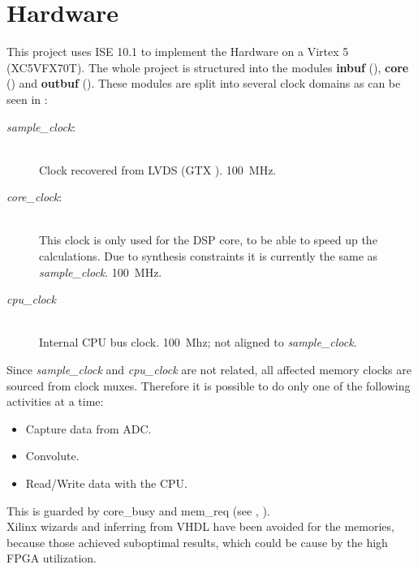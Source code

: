 \documentclass[11pt,technote,a4paper,onecolumn,dvips]{IEEEtran}
\newcommand{\signal}[1]{{\ttfamily #1}}
\newcommand{\module}[1]{{\ttfamily\bfseries #1}}
\newcommand{\clk}[1]{{\itshape\ttfamily #1}}
\begin{document}
\section{Hardware}
\label{sec:hardware}
This project uses ISE 10.1 to implement the Hardware on a Virtex 5 (XC5VFX70T).
The whole project is structured into the modules \module{inbuf}
(), \module{core} () and \module{outbuf}
(). These modules are split into several clock domains as can
be seen in :
\begin{description}
    \item[\clk{sample\_clock}:] \hfill \\
        Clock recovered from LVDS (GTX \cite[p. 179ff]{gtx}). \SI{100}{MHz}.
    \item[\clk{core\_clock}:] \hfill \\
        This clock is only used for the DSP core, to be able
        to speed up the calculations. Due to synthesis constraints it is
        currently the same as \clk{sample\_clock}. \SI{100}{MHz}.
    \item[\clk{cpu\_clock}] \hfill \\
        Internal CPU bus clock. \SI{100}{Mhz}; not aligned to
        \clk{sample\_clock}.
\end{description}
Since \clk{sample\_clock} and \clk{cpu\_clock} are not related, all affected memory
clocks are sourced from clock muxes. Therefore it is possible to do only
one of the following activities at a time:
\begin{itemize}
    \item Capture data from ADC.
    \item Convolute.
    \item Read/Write data with the CPU.
\end{itemize}
This is guarded by \signal{core\_busy} and \signal{mem\_req} (see
, ).\\
Xilinx wizards and inferring from VHDL have been avoided for the memories,
because those achieved suboptimal results, which could be cause by the
high FPGA utilization.
\end{document}
